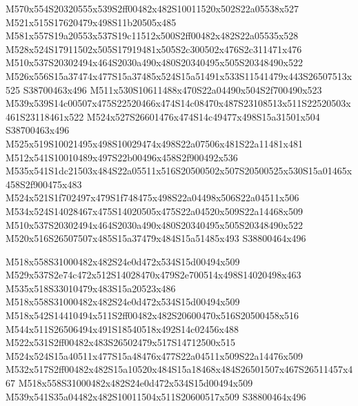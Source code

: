 \documentclass{article}
\begin{document}
\begin{multicols}{2}
M570x554S20320555x539S2ff00482x482S10011520x502S22a05538x527 M521x515S17620479x498S11b20505x485 M581x557S19a20553x537S19c11512x500S2ff00482x482S22a05535x528 M528x524S17911502x505S17919481x505S2c300502x476S2c311471x476 M510x537S20302494x464S2030a490x480S20340495x505S20348490x522 M526x556S15a37474x477S15a37485x524S15a51491x533S11541479x443S26507513x525 S38700463x496 M511x530S10611488x470S22a04490x504S2f700490x523 M539x539S14c00507x475S22520466x474S14c08470x487S23108513x511S22520503x461S23118461x522 M524x527S26601476x474S14c49477x498S15a31501x504 S38700463x496 M525x519S10021495x498S10029474x498S22a07506x481S22a11481x481 M512x541S10010489x497S22b00496x458S2f900492x536 M535x541S1dc21503x484S22a05511x516S20500502x507S20500525x530S15a01465x458S2f900475x483 M524x521S1f702497x479S1f748475x498S22a04498x506S22a04511x506 M534x524S14028467x475S14020505x475S22a04520x509S22a14468x509 M510x537S20302494x464S2030a490x480S20340495x505S20348490x522 M520x516S26507507x485S15a37479x484S15a51485x493 S38800464x496

M518x558S31000482x482S24e0d472x534S15d00494x509 M529x537S2e74c472x512S14028470x479S2e700514x498S14020498x463 M535x518S33010479x483S15a20523x486 M518x558S31000482x482S24e0d472x534S15d00494x509 M518x542S14410494x511S2ff00482x482S20600470x516S20500458x516 M544x511S26506494x491S18540518x492S14c02456x488 M522x531S2ff00482x483S26502479x517S14712500x515 M524x524S15a40511x477S15a48476x477S22a04511x509S22a14476x509 M532x517S2ff00482x482S15a10520x484S15a18468x484S26501507x467S26511457x467 M518x558S31000482x482S24e0d472x534S15d00494x509 M539x541S35a04482x482S10011504x511S20600517x509 S38800464x496


\end{multicols}
\end{document}
